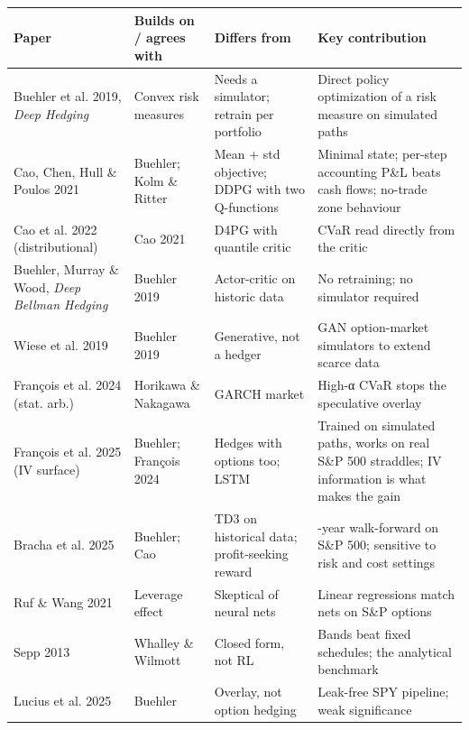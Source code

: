 \documentclass{article}
\begin{document}
\begin{center}\small
\begin{tabularx}{\linewidth}{>{\raggedright\arraybackslash}X >{\raggedright\arraybackslash}X >{\raggedright\arraybackslash}X >{\raggedright\arraybackslash}X}
\toprule
\textbf{Paper} & \textbf{Builds on /\allowbreak{} agrees with} & \textbf{Differs from} & \textbf{Key contribution} \\
\midrule
Buehler et al. 2019, \emph{Deep Hedging} & Convex risk measures & Needs a simulator; retrain per portfolio & Direct policy optimization of a risk measure on simulated paths \\
Cao, Chen, Hull \& Poulos 2021 & Buehler; Kolm \& Ritter & Mean + std objective; DDPG with two Q-functions & Minimal state; per-step accounting P\&L beats cash flows; no-trade zone behaviour \\
Cao et al. 2022 (distributional) & Cao 2021 & D4PG with quantile critic & CVaR read directly from the critic \\
Buehler, Murray \& Wood, \emph{Deep Bellman Hedging} & Buehler 2019 & Actor-critic on historic data & No retraining; no simulator required \\
Wiese et al. 2019 & Buehler 2019 & Generative, not a hedger & GAN option-market simulators to extend scarce data \\
François et al. 2024 (stat. arb.) & Horikawa \& Nakagawa & GARCH market & High-α CVaR stops the speculative overlay \\
François et al. 2025 (IV surface) & Buehler; François 2024 & Hedges with options too; LSTM & Trained on simulated paths, works on real S\&P 500 straddles; IV information is what makes the gain \\
Bracha et al. 2025 & Buehler; Cao & TD3 on historical data; profit-seeking reward & 17-year walk-forward on S\&P 500; sensitive to risk and cost settings \\
Ruf \& Wang 2021 & Leverage effect & Skeptical of neural nets & Linear regressions match nets on S\&P options \\
Sepp 2013 & Whalley \& Wilmott & Closed form, not RL & Bands beat fixed schedules; the analytical benchmark \\
Lucius et al. 2025 & Buehler & Overlay, not option hedging & Leak-free SPY pipeline; weak significance \\
\bottomrule
\end{tabularx}
\end{center}
\end{document}
